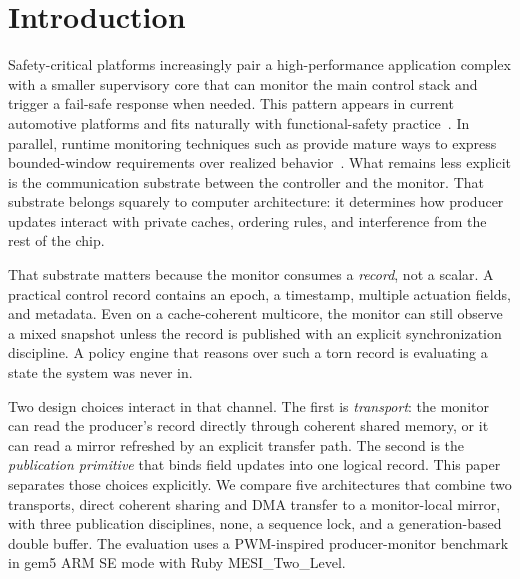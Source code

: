 \section{Introduction}
\label{sec:intro}

Safety-critical \CPS platforms increasingly pair a high-performance
application complex with a smaller supervisory core that can monitor the
main control stack and trigger a fail-safe response when needed. This
pattern appears in current automotive platforms and fits naturally with
functional-safety practice~\cite{ISO26262,ArmAutoSolutionsOverview,%
NVIDIADriveFSI}. In parallel, runtime monitoring techniques such as
\STL provide mature ways to express bounded-window requirements over
realized behavior~\cite{MalerNickovic2004,FainekosPappas2009,%
Deshmukh2017,Bartocci2018CPSMonitoring}. What remains less explicit is
the communication substrate between the controller and the monitor. That
substrate belongs squarely to computer architecture: it determines how
producer updates interact with private caches, ordering rules, and
interference from the rest of the chip.

That substrate matters because the monitor consumes a \emph{record}, not
a scalar. A practical control record contains an epoch, a timestamp,
multiple actuation fields, and metadata. Even on a cache-coherent
multicore, the monitor can still observe a mixed snapshot unless the
record is published with an explicit synchronization discipline. A policy
engine that reasons over such a torn record is evaluating a state the
system was never in.

Two design choices interact in that channel. The first is
\emph{transport}: the monitor can read the producer's record directly
through coherent shared memory, or it can read a mirror refreshed by an
explicit transfer path. The second is the \emph{publication primitive}
that binds field updates into one logical record. This paper separates
those choices explicitly. We compare five architectures that combine two
transports, direct coherent sharing and DMA transfer to a monitor-local
mirror, with three publication disciplines, none, a sequence lock, and
a generation-based double buffer. The evaluation uses a PWM-inspired
producer-monitor benchmark in gem5 ARM SE mode with Ruby
MESI\_Two\_Level.

